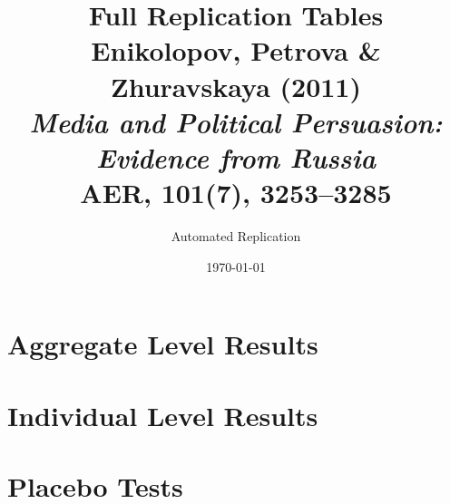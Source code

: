 \documentclass[11pt]{article}
\title{Full Replication Tables\\Enikolopov, Petrova \& Zhuravskaya (2011)\\
\textit{Media and Political Persuasion: Evidence from Russia}\\
AER, 101(7), 3253--3285}
\author{Automated Replication}
\date{\today}
\begin{document}
\maketitle

\section*{Aggregate Level Results}


\clearpage

\clearpage

\clearpage

\section*{Individual Level Results}


\clearpage

\clearpage

\clearpage

\section*{Placebo Tests}


\end{document}

